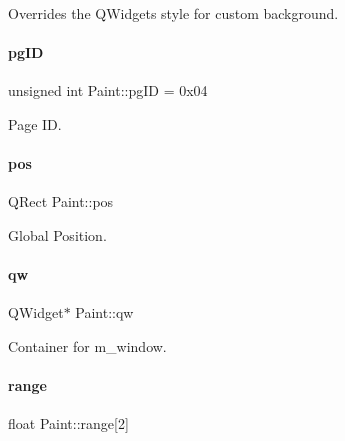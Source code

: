 Overrides the Q\+Widget\textquotesingle{}s style for custom background. 

\mbox{\label{classPaint_af6314388e667b01d9cd88e1d875d0449}} 
\paragraph{\texorpdfstring{pgID}{pgID}}
{\footnotesize\ttfamily unsigned int Paint\+::pg\+ID = 0x04}



Page ID. 

\mbox{\label{classPaint_ad18245bd858cc8c6bd715e56659e3634}} 
\paragraph{\texorpdfstring{pos}{pos}}
{\footnotesize\ttfamily Q\+Rect Paint\+::pos\hspace{0.3cm}{\ttfamily [private]}}



Global Position. 

\mbox{\label{classPaint_abaab9ddb4a329f78b558793a5f3a84c3}} 
\paragraph{\texorpdfstring{qw}{qw}}
{\footnotesize\ttfamily Q\+Widget$\ast$ Paint\+::qw\hspace{0.3cm}{\ttfamily [private]}}



Container for m\+\_\+window. 

\mbox{\label{classPaint_a7c7236ff4eb95bce87e4700dbc3385eb}} 
\paragraph{\texorpdfstring{range}{range}}
{\footnotesize\ttfamily float Paint\+::range\mbox{[}2\mbox{]}\hspace{0.3cm}{\ttfamily [private]}}



